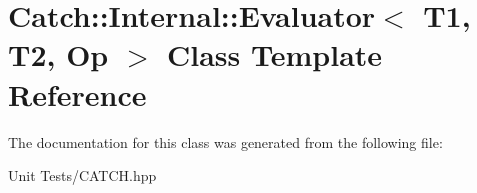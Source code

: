 \hypertarget{classCatch_1_1Internal_1_1Evaluator}{}\section{Catch\+:\+:Internal\+:\+:Evaluator$<$ T1, T2, Op $>$ Class Template Reference}
\label{classCatch_1_1Internal_1_1Evaluator}


The documentation for this class was generated from the following file\+:\begin{DoxyCompactItemize}
\item 
Unit Tests/C\+A\+T\+C\+H.\+hpp\end{DoxyCompactItemize}
